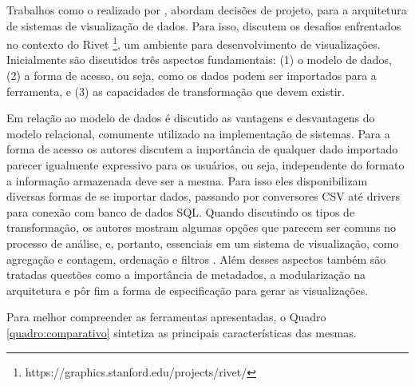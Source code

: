 Trabalhos como o realizado por , abordam decisões de projeto, para a 
arquitetura de sistemas de visualização de dados. Para isso,  discutem 
os desafios enfrentados no contexto do Rivet 
\footnote{https://graphics.stanford.edu/projects/rivet/}, um ambiente para desenvolvimento de 
visualizações. Inicialmente são discutidos três aspectos fundamentais: (1) o modelo de dados, 
(2) a forma de acesso, ou seja, como os dados podem ser importados para a ferramenta, e (3) 
as capacidades de transformação que devem existir. 

Em relação ao modelo de dados é discutido as vantagens e desvantagens do modelo relacional, 
comumente utilizado na implementação de sistemas. Para a forma de acesso os autores discutem 
a importância de qualquer dado importado parecer igualmente expressivo para os usuários, ou 
seja, independente do formato a informação armazenada deve ser a mesma. Para isso eles 
disponibilizam diversas formas de se importar dados, passando por conversores CSV até 
drivers para conexão com banco de dados SQL. Quando discutindo os tipos de transformação, 
os autores mostram algumas opções que parecem ser comuns no processo de análise, e, 
portanto, essenciais em um sistema de visualização, como agregação e contagem, ordenação e 
filtros \cite{tang2004}. Além desses aspectos também são tratadas questões como a 
importância de metadados, a modularização na arquitetura e pôr fim a forma de especificação 
para gerar as visualizações.

Para melhor compreender as ferramentas apresentadas, o Quadro \ref{quadro:comparativo} sintetiza as principais 
características das mesmas.

